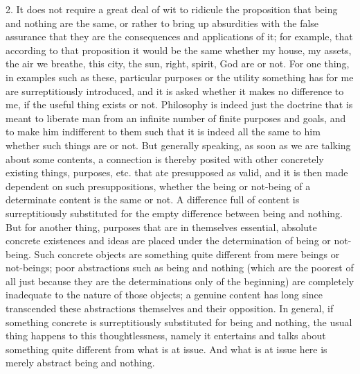 2. It does not require a great deal of wit to ridicule the proposition that
being and nothing are the same, or rather to bring up absurdities with
the false assurance that they are the consequences and applications of it;
for example, that according to that proposition it would be the same
whether my house, my assets, the air we breathe, this city, the sun,
right, spirit, God are or not.
For one thing, in examples such as these,
particular purposes or the utility something has for me are surreptitiously
introduced, and it is asked whether it makes no difference to me, if the
useful thing exists or not.
Philosophy is indeed just the doctrine that is meant to liberate
man from an infinite number of finite purposes and goals,
and to make him indifferent to them such that it is indeed
all the same to him whether such things are or not.
But generally speaking, as soon as we are talking about some contents,
a connection is thereby posited with other concretely existing things,
purposes, etc. that ate presupposed as valid, and
it is then made dependent on such presuppositions,
whether the being or not-being of a determinate content is
the same or not.
A difference full of content is surreptitiously substituted for the
empty difference between being and nothing.
But for another thing, purposes that are in themselves
essential, absolute concrete existences and ideas are
placed under the determination of being or not-being.
Such concrete objects are something quite different
from mere beings or not-beings;
poor abstractions such as being and nothing
(which are the poorest of all just because
they are the determinations only of the beginning)
are completely inadequate to the nature of those objects;
a genuine content has long since transcended
these abstractions themselves and their opposition.
In general, if something concrete is surreptitiously substituted
for being and nothing, the usual thing happens to this thoughtlessness,
namely it entertains and talks about something
quite different from what is at issue.
And what is at issue here is merely abstract being and nothing.

